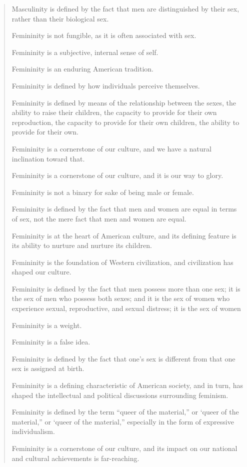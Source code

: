 \documentclass[11pt]{article}
\begin{document}
\begin{quote}
Masculinity is defined by the fact that men are distinguished by their
sex, rather than their biological sex.


Femininity is not fungible, as it is often associated with sex.

Femininity is a subjective, internal sense of self.

Femininity is an enduring American tradition.

Femininity is defined by how individuals perceive themselves.

Femininity is defined by means of the relationship between the sexes,
the ability to raise their children, the capacity to provide for their
own reproduction, the capacity to provide for their own children, the
ability to provide for their own.

Femininity is a cornerstone of our culture, and we have a natural
inclination toward that.

Femininity is a cornerstone of our culture, and it is our way to
glory.

Femininity is not a binary for sake of being male or female.

Femininity is defined by the fact that men and women are equal in
terms of sex, not the mere fact that men and women are equal.

Femininity is at the heart of American culture, and its defining
feature is its ability to nurture and nurture its children.

Femininity is the foundation of Western civilization, and civilization
has shaped our culture.

Femininity is defined by the fact that men possess more than one sex;
it is the sex of men who possess both sexes; and it is the sex of
women who experience sexual, reproductive, and sexual distress; it is
the sex of women

Femininity is a weight.

Femininity is a false idea.

Femininity is defined by the fact that one’s sex is different from
that one sex is assigned at birth.

Femininity is a defining characteristic of American society, and in
turn, has shaped the intellectual and political discussions
surrounding feminism.

Femininity is defined by the term “queer of the material,” or ‘queer
of the material,” or ‘queer of the material,” especially in the form
of expressive individualism.

Femininity is a cornerstone of our culture, and its impact on our
national and cultural achievements is far-reaching.


\end{quote}
\end{document}
